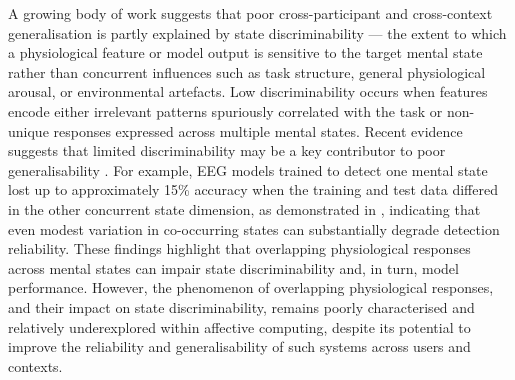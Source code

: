 \documentclass[lettersize,journal]{IEEEtran}
\begin{document}
A growing body of work suggests that poor cross-participant and cross-context generalisation is partly explained by state discriminability — the extent to which a physiological feature or model output is sensitive to the target mental state rather than concurrent influences such as task structure, general physiological arousal, or environmental artefacts. Low discriminability occurs when features encode either irrelevant patterns spuriously correlated with the task or non-unique responses expressed across multiple mental states. Recent evidence suggests that limited discriminability may be a key contributor to poor generalisability \cite{parentDiagnosticityPsychophysiologicalSignatures2019, bagheriEEGbasedDetectionMental2020, bagheriSimultaneousClassificationBoth2022}. For example, EEG models trained to detect one mental state lost up to approximately 15\% accuracy when the training and test data differed in the other concurrent state dimension, as demonstrated in \cite{bagheriEEGbasedDetectionMental2020}, indicating that even modest variation in co-occurring states can substantially degrade detection reliability. These findings highlight that overlapping physiological responses across mental states can impair state discriminability and, in turn, model performance. However, the phenomenon of overlapping physiological responses, and their impact on state discriminability, remains poorly characterised and relatively underexplored within affective computing, despite its potential to improve the reliability and generalisability of such systems across users and contexts.
\end{document}
